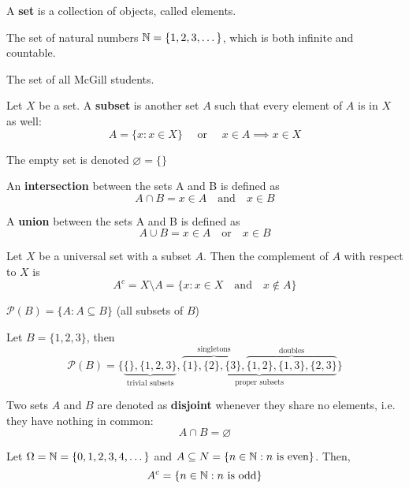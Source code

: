 \documentclass{article}
\begin{document}
	\begin{defn}
		A \textbf{set} is a collection of objects, called elements.
	\end{defn}
	\begin{exmp}
		The set of natural numbers $\mathbb{N} = \{ 1, 2, 3, \dots\}$, which is both infinite and countable.
	\end{exmp}
	\begin{exmp}
		The set of all McGill students.
	\end{exmp}
	\begin{defn}
		Let $X$ be a set. A \textbf{subset} is another set $A$ such that every element of $A$ is in $X$ as well:
		$$ A = \{ x: x \in X\} \quad \text{ or } \quad x \in A \implies x \in X$$
	\end{defn}
	\begin{rem}
		The empty set is denoted $\varnothing = \{\}$
	\end{rem}
	\begin{defn}
		An \textbf{intersection} between the sets A and B is defined as
		$$ A \cap B = x \in A \quad \text{and}\quad x \in B$$
	\end{defn}
	\begin{defn}
		A \textbf{union} between the sets A and B is defined as
		$$ A \cup B = x \in A \quad \text{or}\quad x \in B$$
	\end{defn}
	\begin{defn}
		Let $X$ be a universal set with a subset $A$. Then the complement of $A$ with respect to $X$ is
		$$ A^c = X \setminus A = \{ x: x \in X \quad \text{and} \quad x \notin A \}$$
	\end{defn}
	\begin{exmp}
		$\mathcal{P} (B) = \{ A: A \subseteq B \}$ (all subsets of $B$)
		
		Let $B = \{1,2,3\}$, then
		$$ \mathcal{P}(B) = \bigg\{ \underbrace{ \{\}, \{1,2,3\}}_{\text{trivial subsets}}, \underbrace{\overbrace{\{1\}, \{2\}, \{3\},}^{\text{singletons}} \overbrace{\{1,2\}, \{1,3\}, \{2,3\}}^{\text{doubles}}}_{\text{proper subsets}} \bigg\}$$
	\end{exmp}
	\begin{defn}
		Two sets $A$ and $B$ are denoted as \textbf{disjoint} whenever they share no elements, i.e. they have nothing in common:
		$$ A \cap B = \varnothing$$ 
	\end{defn}
	\begin{exmp}
		Let $\Omega = \mathbb{N} = \{ 0,1,2,3,4,\dots\}$ and $A \subseteq N = \{ n \in \mathbb{N}: n \text{ is even}\}$. Then,
		$$ A^c = \{ n \in \mathbb{N} : n \text{ is odd}\}$$
	\end{exmp}
\pagebreak
\end{document}
